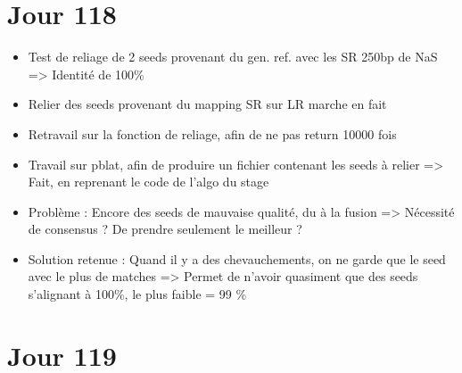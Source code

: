 \documentclass[12pt]{report}
\begin{document}
\section{Jour 118}

\begin{itemize}
	\item Test de reliage de 2 seeds provenant du gen. ref. avec les SR 250bp de NaS => Identité de 100\%
	
	\item Relier des seeds provenant du mapping SR sur LR marche en fait
	
	\item Retravail sur la fonction de reliage, afin de ne pas return 10000 fois
	
	\item Travail sur pblat, afin de produire un fichier contenant les seeds à relier => Fait, en reprenant le code de l'algo du stage
	
	\item Problème : Encore des seeds de mauvaise qualité, du à la fusion => Nécessité de consensus ? De prendre seulement le meilleur ?
	
	\item Solution retenue : Quand il y a des chevauchements, on ne garde que le seed avec le plus de matches	
		  => Permet de n'avoir quasiment que des seeds s'alignant à 100\%, le plus faible = 99 \%
\end{itemize}

\section{Jour 119}
\end{document}
